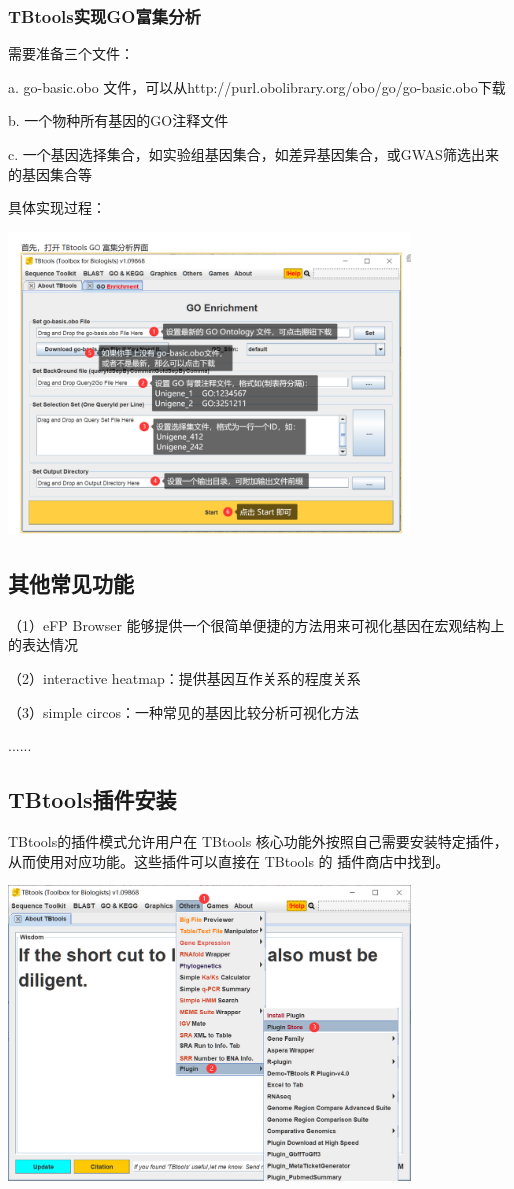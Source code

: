 \subsubsection{TBtools实现GO富集分析}

需要准备三个文件：

a. go-basic.obo 文件，可以从http://purl.obolibrary.org/obo/go/go-basic.obo下载

b. 一个物种所有基因的GO注释文件

c. 一个基因选择集合，如实验组基因集合，如差异基因集合，或GWAS筛选出来的基因集合等

具体实现过程：

\includegraphics[width=0.8\textwidth]{./image/gdk/8.2.4.png}

\subsection{其他常见功能}

（1）eFP Browser 能够提供一个很简单便捷的方法用来可视化基因在宏观结构上的表达情况

（2）interactive heatmap：提供基因互作关系的程度关系

（3）simple circos：一种常见的基因比较分析可视化方法

......

\subsection{TBtools插件安装}

TBtools的插件模式允许用户在 TBtools 核心功能外按照自己需要安装特定插件，从而使用对应功能。这些插件可以直接在 TBtools 的 插件商店中找到。

\includegraphics[width=0.8\textwidth]{./image/gdk/8.3.1.png}

